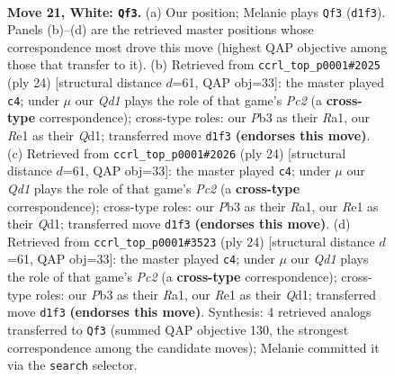 \documentclass[11pt]{article}
\begin{document}
\clearpage

\begin{figure}[p]\centering
\begin{subfigure}{0.46\textwidth}\centering
\resizebox{\linewidth}{!}{%
\newchessgame
\chessboard[
  setfen={rb1qr1k1/1p1b1ppp/pP2p1n1/8/3p2P1/1P5B/P2P1P1P/RNBQRK2 w - - 2 21},
  showmover=false,
  pgfstyle=straightmove, color=movearrow, markmove={d1-f3}
]}
\caption{}
\end{subfigure}\hfill
\begin{subfigure}{0.46\textwidth}\centering
\resizebox{\linewidth}{!}{%
\newchessgame
\chessboard[
  setfen={r1bqk2r/5pp1/p1p1p2p/3nb3/4N1P1/7P/PPP2PB1/R1BQK2R w KQkq - 2 13},
  showmover=false,
  pgfstyle=straightmove, color=movearrow, markmove={c2-c4}
]}
\caption{}
\end{subfigure}
\\[4pt]
\begin{subfigure}{0.46\textwidth}\centering
\resizebox{\linewidth}{!}{%
\newchessgame
\chessboard[
  setfen={r1bqk2r/5pp1/p1p1p2p/3nb3/4N1P1/7P/PPP2PB1/R1BQK2R w KQkq - 2 13},
  showmover=false,
  pgfstyle=straightmove, color=movearrow, markmove={c2-c4}
]}
\caption{}
\end{subfigure}\hfill
\begin{subfigure}{0.46\textwidth}\centering
\resizebox{\linewidth}{!}{%
\newchessgame
\chessboard[
  setfen={r1bqk2r/5pp1/p1p1p2p/3nb3/4N1P1/7P/PPP2PB1/R1BQK2R w KQkq - 2 13},
  showmover=false,
  pgfstyle=straightmove, color=movearrow, markmove={c2-c4}
]}
\caption{}
\end{subfigure}
\caption{\textbf{Move 21, White: \texttt{Qf3}.} (a) Our position; Melanie plays \texttt{Qf3} (\texttt{d1f3}). Panels (b)--(d) are the retrieved master positions whose correspondence most drove this move (highest QAP objective among those that transfer to it). (b) Retrieved from \texttt{ccrl\_top\_p0001\#2025} (ply 24) [structural distance $d$=61, QAP obj=33]: the master played \texttt{c4}; under $\mu$ our \emph{Qd1} plays the role of that game's \emph{Pc2} (a \textbf{cross-type} correspondence); cross-type roles: our \emph{P}b3 as their \emph{R}a1, our \emph{R}e1 as their \emph{Q}d1; transferred move \texttt{d1f3} \textbf{(endorses this move)}. (c) Retrieved from \texttt{ccrl\_top\_p0001\#2026} (ply 24) [structural distance $d$=61, QAP obj=33]: the master played \texttt{c4}; under $\mu$ our \emph{Qd1} plays the role of that game's \emph{Pc2} (a \textbf{cross-type} correspondence); cross-type roles: our \emph{P}b3 as their \emph{R}a1, our \emph{R}e1 as their \emph{Q}d1; transferred move \texttt{d1f3} \textbf{(endorses this move)}. (d) Retrieved from \texttt{ccrl\_top\_p0001\#3523} (ply 24) [structural distance $d$=61, QAP obj=33]: the master played \texttt{c4}; under $\mu$ our \emph{Qd1} plays the role of that game's \emph{Pc2} (a \textbf{cross-type} correspondence); cross-type roles: our \emph{P}b3 as their \emph{R}a1, our \emph{R}e1 as their \emph{Q}d1; transferred move \texttt{d1f3} \textbf{(endorses this move)}. Synthesis: 4 retrieved analogs transferred to \texttt{Qf3} (summed QAP objective 130, the strongest correspondence among the candidate moves); Melanie committed it via the \texttt{search} selector.}
\label{fig:thought-m40}
\end{figure}
\end{document}
